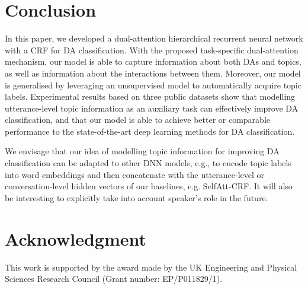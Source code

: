 \documentclass[11pt,a4paper]{article}
\begin{document}
\section{Conclusion}
In this paper, we developed a dual-attention hierarchical recurrent neural network with a CRF for DA classification. 
With the proposed task-specific dual-attention mechanism, our model is able to capture information about both DAs and topics, as well as information about the interactions between them. 
Moreover, our model is generalised by leveraging an unsupervised model to automatically acquire topic labels.
Experimental results based on three public datasets show that  modelling utterance-level topic information as an auxiliary task can effectively improve DA classification, and that our model is able to achieve better or comparable  performance to the state-of-the-art deep learning methods for DA classification. 

We envisage that our idea of modelling topic information for improving DA classification can be adapted to other DNN models, e.g., to encode topic labels into word embeddings and then concatenate with the utterance-level or conversation-level hidden vectors of our baselines, e.g. SelfAtt-CRF. It will also be interesting to explicitly take into account speaker's role in the future.

\section*{Acknowledgment}
This work is supported by the award made by the UK Engineering and Physical Sciences Research Council (Grant number: EP/P011829/1).




\end{document}
